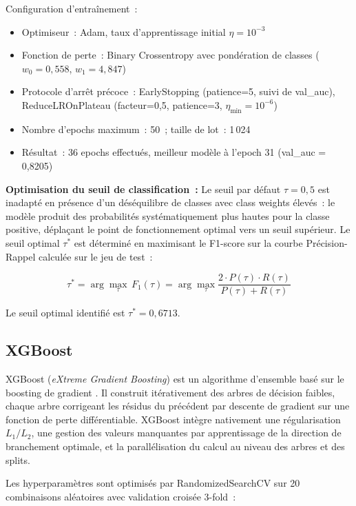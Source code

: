 Configuration d'entraînement~:
\begin{itemize}
    \item Optimiseur~: Adam, taux d'apprentissage initial $\eta = 10^{-3}$
    \item Fonction de perte~: Binary Crossentropy avec pondération de classes ($w_0 = 0{,}558$, $w_1 = 4{,}847$)
    \item Protocole d'arrêt précoce~: EarlyStopping (patience=5, suivi de val\_auc), ReduceLROnPlateau (facteur=0,5, patience=3, $\eta_{\min} = 10^{-6}$)
    \item Nombre d'epochs maximum~: 50~; taille de lot~: 1\,024
    \item Résultat~: 36 epochs effectués, meilleur modèle à l'epoch 31 (val\_auc = 0,8205)
\end{itemize}

\textbf{Optimisation du seuil de classification~:} Le seuil par défaut $\tau = 0{,}5$ est inadapté en présence d'un déséquilibre de classes avec class weights élevés~: le modèle produit des probabilités systématiquement plus hautes pour la classe positive, déplaçant le point de fonctionnement optimal vers un seuil supérieur. Le seuil optimal $\tau^*$ est déterminé en maximisant le F1-score sur la courbe Précision-Rappel calculée sur le jeu de test~:

\begin{equation}
\tau^* = \arg\max_{\tau} \, F_1(\tau) = \arg\max_{\tau} \frac{2 \cdot P(\tau) \cdot R(\tau)}{P(\tau) + R(\tau)}
\end{equation}

Le seuil optimal identifié est $\tau^* = 0{,}6713$.

\subsection{XGBoost}

XGBoost (\textit{eXtreme Gradient Boosting}) est un algorithme d'ensemble basé sur le boosting de gradient \cite{chen_xgboost}. Il construit itérativement des arbres de décision faibles, chaque arbre corrigeant les résidus du précédent par descente de gradient sur une fonction de perte différentiable. XGBoost intègre nativement une régularisation $L_1/L_2$, une gestion des valeurs manquantes par apprentissage de la direction de branchement optimale, et la parallélisation du calcul au niveau des arbres et des splits.

Les hyperparamètres sont optimisés par RandomizedSearchCV sur 20 combinaisons aléatoires avec validation croisée 3-fold~:

